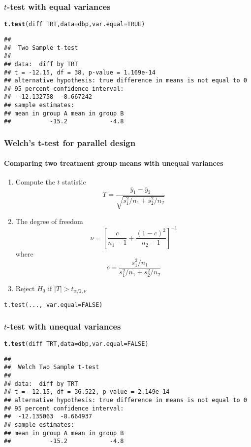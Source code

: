 \documentclass[table,10pt]{beamer}\usepackage[]{graphicx}\usepackage[]{color}
\makeatletter
\newcommand{\hlnum}[1]{\textcolor[rgb]{0.686,0.059,0.569}{#1}}%
\newcommand{\hlopt}[1]{\textcolor[rgb]{0,0,0}{#1}}%
\newcommand{\hlstd}[1]{\textcolor[rgb]{0.345,0.345,0.345}{#1}}%
\newcommand{\hlkwc}[1]{\textcolor[rgb]{0.333,0.667,0.333}{#1}}%
\newcommand{\hlkwd}[1]{\textcolor[rgb]{0.737,0.353,0.396}{\textbf{#1}}}%
\newenvironment{kframe}{%
 \def\at@end@of@kframe{}%
 \ifinner\ifhmode%
  \def\at@end@of@kframe{\end{minipage}}%
  \begin{minipage}{\columnwidth}%
 \fi\fi%
 \def\FrameCommand##1{\hskip\@totalleftmargin \hskip-\fboxsep
 \colorbox{shadecolor}{##1}\hskip-\fboxsep
     \hskip-\linewidth \hskip-\@totalleftmargin \hskip\columnwidth}%
 \MakeFramed {\advance\hsize-\width
   \@totalleftmargin\z@ \linewidth\hsize
   \@setminipage}}%
 {\par\unskip\endMakeFramed%
 \at@end@of@kframe}
\newenvironment{knitrout}{}{} %
\makeatother
\begin{document}
\begin{CJK*}{UTF8}{gbsn}
\begin{frame}[t,containsverbatim]
\frametitle{$t$-test with equal variances}
\begin{knitrout}\footnotesize
{}\color{fgcolor}\begin{kframe}
\begin{alltt}
\hlkwd{t.test}\hlstd{(diff} \hlopt{~} \hlstd{TRT,} \hlkwc{data}\hlstd{=dbp,} \hlkwc{var.equal}\hlstd{=}\hlnum{TRUE}\hlstd{)}
\end{alltt}
\begin{verbatim}
## 
## 	Two Sample t-test
## 
## data:  diff by TRT
## t = -12.15, df = 38, p-value = 1.169e-14
## alternative hypothesis: true difference in means is not equal to 0
## 95 percent confidence interval:
##  -12.132758  -8.667242
## sample estimates:
## mean in group A mean in group B 
##           -15.2            -4.8
\end{verbatim}
\end{kframe}
\end{knitrout}
\end{frame}


\begin{frame}[t,containsverbatim]
\frametitle{Welch's t-test for parallel design}
\framesubtitle{Comparing two treatment group means with unequal variances}
\begin{enumerate}
	\item Compute the $t$ statistic
	$$
T = \frac{\bar{y}_1 - \bar{y}_2}{\sqrt{s_1^2/n_1 + s_2^2/n_2}}
	$$
	\item The degree of freedom
	$$
\nu = \left[ \frac{c}{n_1-1} + \frac{(1-c)^2}{n_2-1}\right]^{-1}
	$$
	where
	$$
c = \frac{s_1^2/n_1}{s_1^2/n_1 + s_2^2/n_2}
	$$
	\item Reject $H_0$ if $|T| > t_{\alpha/2, \nu}$
\end{enumerate}
\begin{lstlisting}
t.test(..., var.equal=FALSE)
\end{lstlisting}
\end{frame}

\begin{frame}[t,containsverbatim]
\frametitle{$t$-test with unequal variances}
\begin{knitrout}\footnotesize
{}\color{fgcolor}\begin{kframe}
\begin{alltt}
\hlkwd{t.test}\hlstd{(diff} \hlopt{~} \hlstd{TRT,} \hlkwc{data}\hlstd{=dbp,} \hlkwc{var.equal}\hlstd{=}\hlnum{FALSE}\hlstd{)}
\end{alltt}
\begin{verbatim}
## 
## 	Welch Two Sample t-test
## 
## data:  diff by TRT
## t = -12.15, df = 36.522, p-value = 2.149e-14
## alternative hypothesis: true difference in means is not equal to 0
## 95 percent confidence interval:
##  -12.135063  -8.664937
## sample estimates:
## mean in group A mean in group B 
##           -15.2            -4.8
\end{verbatim}
\end{kframe}
\end{knitrout}
\end{frame}



\end{CJK*}
\end{document}
